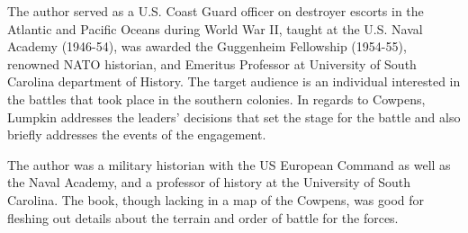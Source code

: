 The author served as a U.S. Coast Guard officer on destroyer escorts in the
Atlantic and Pacific Oceans during World War II, taught at the U.S. Naval
Academy (1946-54), was awarded the Guggenheim Fellowship (1954-55), renowned
NATO historian, and Emeritus Professor at University of South Carolina
department of History.  The target audience is an individual interested in the
battles that took place in the southern colonies.  In regards to Cowpens,
Lumpkin addresses the leaders' decisions that set the stage for the battle and
also briefly addresses the events of the engagement. 

The author was a military historian with the US European Command as
well as the Naval Academy, and a professor of history at the University of
South Carolina.  The book, though lacking in a map of the Cowpens, was good for
fleshing out details about the terrain and order of battle for the forces.
